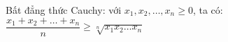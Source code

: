 \documentclass[12pt,a4paper]{article}
\begin{document}
\noindent
Bất đẳng thức Cauchy: với $x_1,x_2,\ldots,x_n\geq 0$, ta có:
$\dfrac{x_1 +x_2+\ldots+x_n}{n}\geq \sqrt[n]{x_1 x_2\ldots x_n}$
\end{document}
